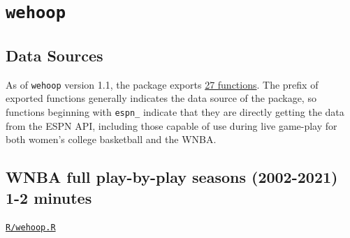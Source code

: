 \documentclass[12pt]{article}
\begin{document}
\section{\texttt{wehoop}}
\subsection{Data Sources}
As of \texttt{wehoop} version 1.1, the package exports \href{https://saiemgilani.github.io/wehoop/reference/index.html}{27 functions}. The prefix of exported functions generally indicates the data source of the package, so functions beginning with \texttt{espn\_} indicate that they are directly getting the data from the ESPN API, including those capable of use during live game-play for both women's college basketball and the WNBA.  
\subsection{WNBA full play-by-play seasons (2002-2021) ~ 1-2 minutes}
\texttt{\href{https://github.com/saiemgilani/The\_SportsDataverse\_Initiative/R/wehoop.R}{R/wehoop.R}}
\end{document}
